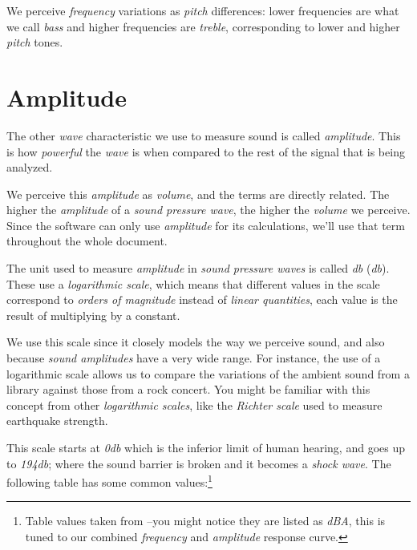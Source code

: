 \documentclass[10pt,a4paper]{report}
\newcommand{\define}[1]{\textit{\acrlong{#1}} (\textit{\acrshort{#1}})}
\newcommand{\ac}[1]{\textit{\acrshort{#1}}}
\begin{document}
We perceive \textit{frequency} variations as \textit{pitch} differences: lower frequencies are what we call \textit{bass} and higher frequencies are \textit{treble}, corresponding to lower and higher \textit{pitch} tones.

\section{Amplitude}

The other \textit{wave} characteristic we use to measure sound is called \textit{amplitude}. This is how \textit{powerful} the \textit{wave} is when compared to the rest of the signal that is being analyzed. 

We perceive this \textit{amplitude} as \textit{volume}, and the terms are directly related. The higher the \textit{amplitude} of a \textit{sound pressure wave}, the higher the \textit{volume} we perceive. Since the software can only use \textit{amplitude} for its calculations, we'll use that term throughout the whole document.

The unit used to measure \textit{amplitude} in \textit{sound pressure waves} is called \define{db}. These use a \textit{logarithmic scale}, which means that different values in the scale correspond to \textit{orders of magnitude} instead of \textit{linear quantities}, each value is the result of multiplying by a constant. 

We use this scale since it closely models the way we perceive sound, and also because \textit{sound amplitudes} have a very wide range. For instance, the use of a logarithmic scale allows us to compare the variations of the ambient sound from a library against those from a rock concert. You might be familiar with this concept from other \textit{logarithmic scales}, like the \textit{Richter scale} used to measure earthquake strength.

This scale starts at \textit{0\ac{db}} which is the inferior limit of human hearing, and goes up to \textit{194\ac{db}}; where the sound barrier is broken and it becomes a \textit{shock wave}. The following table has some common values:\footnote{Table values taken from \cite{noiselevels}--you might notice they are listed as \textit{dBA}, this is tuned to our combined \textit{frequency} and \textit{amplitude} response curve.}
\end{document}
